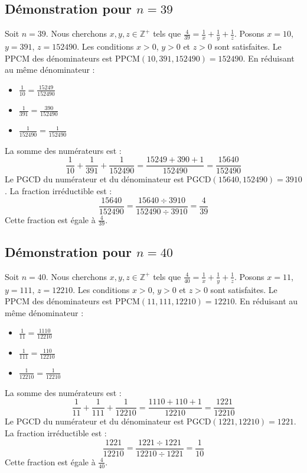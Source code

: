 \documentclass[11pt,a4paper]{article}
\begin{document}
\subsection{Démonstration pour $n = 39$}
Soit $n = 39$. Nous cherchons $x, y, z \in \mathbb{Z}^{+}$ tels que $\frac{4}{39} = \frac{1}{x} + \frac{1}{y} + \frac{1}{z}$.
Posons $x = 10$, $y = 391$, $z = 152490$.
Les conditions $x > 0$, $y > 0$ et $z > 0$ sont satisfaites.
Le PPCM des dénominateurs est $\text{PPCM}(10, 391, 152490) = 152490$.
En réduisant au même dénominateur :
\begin{itemize}
    \item $\frac{1}{10} = \frac{15249}{152490}$
    \item $\frac{1}{391} = \frac{390}{152490}$
    \item $\frac{1}{152490} = \frac{1}{152490}$
\end{itemize}
La somme des numérateurs est :
$$ \frac{1}{10} + \frac{1}{391} + \frac{1}{152490} = \frac{15249 + 390 + 1}{152490} = \frac{15640}{152490} $$
Le PGCD du numérateur et du dénominateur est $\text{PGCD}(15640, 152490) = 3910$.
La fraction irréductible est :
$$ \frac{15640}{152490} = \frac{15640 \div 3910}{152490 \div 3910} = \frac{4}{39} $$
Cette fraction est égale à $\frac{4}{39}$.

\subsection{Démonstration pour $n = 40$}
Soit $n = 40$. Nous cherchons $x, y, z \in \mathbb{Z}^{+}$ tels que $\frac{4}{40} = \frac{1}{x} + \frac{1}{y} + \frac{1}{z}$.
Posons $x = 11$, $y = 111$, $z = 12210$.
Les conditions $x > 0$, $y > 0$ et $z > 0$ sont satisfaites.
Le PPCM des dénominateurs est $\text{PPCM}(11, 111, 12210) = 12210$.
En réduisant au même dénominateur :
\begin{itemize}
    \item $\frac{1}{11} = \frac{1110}{12210}$
    \item $\frac{1}{111} = \frac{110}{12210}$
    \item $\frac{1}{12210} = \frac{1}{12210}$
\end{itemize}
La somme des numérateurs est :
$$ \frac{1}{11} + \frac{1}{111} + \frac{1}{12210} = \frac{1110 + 110 + 1}{12210} = \frac{1221}{12210} $$
Le PGCD du numérateur et du dénominateur est $\text{PGCD}(1221, 12210) = 1221$.
La fraction irréductible est :
$$ \frac{1221}{12210} = \frac{1221 \div 1221}{12210 \div 1221} = \frac{1}{10} $$
Cette fraction est égale à $\frac{4}{40}$.
\end{document}
